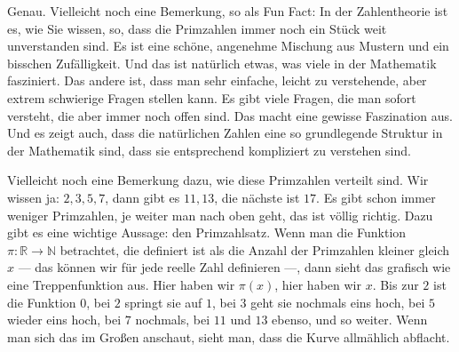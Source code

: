 \begin{spoken-clean}[01:07:28 - 01:10:33]
Genau. Vielleicht noch eine Bemerkung, so als Fun Fact: In der Zahlentheorie ist es, wie Sie wissen, so, dass die Primzahlen immer noch ein Stück weit unverstanden sind. Es ist eine schöne, angenehme Mischung aus Mustern und ein bisschen Zufälligkeit. Und das ist natürlich etwas, was viele in der Mathematik fasziniert. Das andere ist, dass man sehr einfache, leicht zu verstehende, aber extrem schwierige Fragen stellen kann. Es gibt viele Fragen, die man sofort versteht, die aber immer noch offen sind. Das macht eine gewisse Faszination aus. Und es zeigt auch, dass die natürlichen Zahlen eine so grundlegende Struktur in der Mathematik sind, dass sie entsprechend kompliziert zu verstehen sind.

Vielleicht noch eine Bemerkung dazu, wie diese Primzahlen verteilt sind. Wir wissen ja: $2, 3, 5, 7$, dann gibt es $11, 13$, die nächste ist $17$. Es gibt schon immer weniger Primzahlen, je weiter man nach oben geht, das ist völlig richtig. Dazu gibt es eine wichtige Aussage: den Primzahlsatz. Wenn man die Funktion $\pi \colon \mathbb{R} \to \mathbb{N}$ betrachtet, die definiert ist als die Anzahl der Primzahlen kleiner gleich $x$ --- das können wir für jede reelle Zahl definieren ---, dann sieht das grafisch wie eine Treppenfunktion aus. Hier haben wir $\pi(x)$, hier haben wir $x$. Bis zur $2$ ist die Funktion $0$, bei $2$ springt sie auf $1$, bei $3$ geht sie nochmals eins hoch, bei $5$ wieder eins hoch, bei $7$ nochmals, bei $11$ und $13$ ebenso, und so weiter. Wenn man sich das im Großen anschaut, sieht man, dass die Kurve allmählich abflacht.
\end{spoken-clean}

